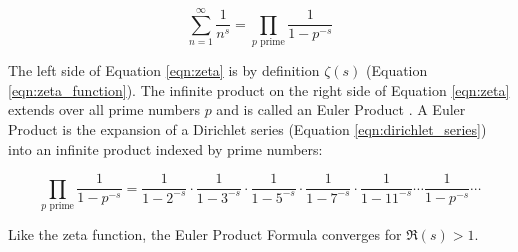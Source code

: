 \documentclass[11pt, oneside]{article}   	%
\theoremstyle{definition}
\begin{document}
\medskip
\begin{equation}
\sum^\infty_{n = 1} \frac{1}{n^s} = \! \! \! \prod_{\text{$p$ prime}} \!  \frac{1}{1 - p^{-s}}
\label{eqn:zeta}
\end{equation}

\bigskip
\noindent
The left side of Equation \ref{eqn:zeta} is by definition $\zeta(s)$ (Equation \ref{eqn:zeta_function}). The infinite product on the right side of Equation \ref{eqn:zeta}  
extends over all prime numbers $p$ and is called an Euler Product \cite{euler_product}. A Euler Product is the expansion of a Dirichlet series 
(Equation \ref{eqn:dirichlet_series}) into an infinite product indexed by prime numbers:

\begin{equation*}
\prod_{\text{$p$ prime}} \!  \frac{1}{1 - p^{-s}} = \frac{1}{1 - 2^{-s}} \cdot \frac{1}{1 - 3^{-s}} \cdot  \frac{1}{1 - 5^{-s}} \cdot  \frac{1}{1 - 7^{-s}} \cdot  \frac{1}{1 - 11^{-s}} \cdots  \frac{1}{1 - p^{-s}} \cdots
\end{equation*}

\bigskip
\noindent
Like the zeta function, the Euler Product Formula converges for $\Re(s) > 1$.




\end{document}
